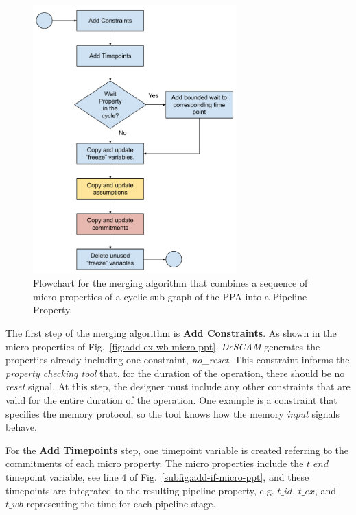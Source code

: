 \begin{figure}[htb!]
	\centering
	\includegraphics[width=0.7\textwidth]{images/algorithm.pdf}
	\caption{Flowchart for the merging algorithm that combines a sequence of micro properties of a cyclic sub-graph of the PPA into a Pipeline Property.}
	\label{fig:algorithm-flow}
\end{figure}

The first step of the merging algorithm is \textbf{Add Constraints}. As shown in the micro properties of Fig.~\ref{fig:add-ex-wb-micro-ppt}, \textit{DeSCAM} generates the properties already including one constraint, \textit{no\_reset}. This constraint informs the \textit{property checking tool} that, for the duration of the operation, there should be no \textit{reset} signal. At this step, the designer must include any other constraints that are valid for the entire duration of the operation. One example is a constraint that specifies the memory protocol, so the tool knows how the memory \textit{input} signals behave.

For the \textbf{Add Timepoints} step, one timepoint variable is created referring to the commitments of each micro property. The micro properties include the $t\_end$ timepoint variable, see line 4 of Fig.~\ref{subfig:add-if-micro-ppt}, and these timepoints are integrated to the resulting pipeline property, e.g. $t\_id$, $t\_ex$, and $t\_wb$ representing the time for each pipeline stage.

